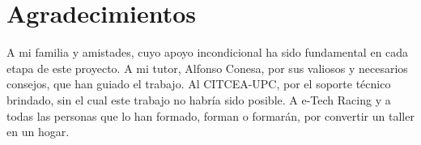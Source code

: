 \chapter*{Agradecimientos}

A mi familia y amistades, cuyo apoyo incondicional ha sido fundamental en cada etapa de este proyecto. A mi tutor, Alfonso Conesa, por sus valiosos y necesarios consejos, que han guiado el trabajo. Al CITCEA-UPC, por el soporte técnico brindado, sin el cual este trabajo no habría sido posible. A e-Tech Racing y a todas las personas que lo han formado, forman o formarán, por convertir un taller en un hogar.